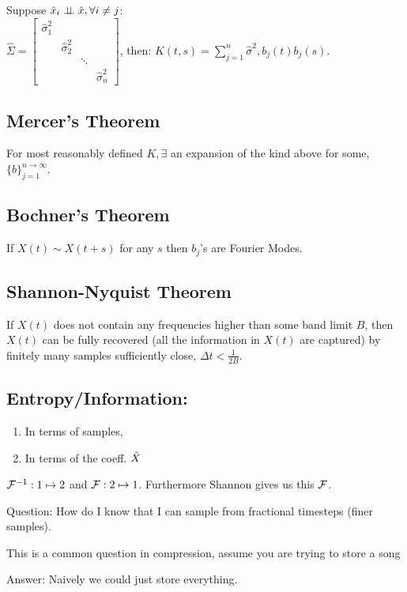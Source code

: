 Suppose $\hat{x}_i \mathrel{\perp\!\!\!\perp} \hat{x}, \forall i \neq j$:\\
$
\hat{\Sigma}=\begin{bmatrix}
\hat{\sigma}_1^2 & & & \\
& \hat{\sigma}_2^2 & & \\
& & \ddots & \\
& & & \hat{\sigma}_n^2
\end{bmatrix}
$, 
then: 
$K(t, s)=\sum_{j=1}^n \hat{\sigma}^2, b_j(t) b_j(s).$

\subsection{Mercer's Theorem}
For most reasonably defined $K, \exists$ an expansion of the kind above for some, $\{b\}_{j=1}^{n \rightarrow \infty}$.

\subsection{Bochner's Theorem}
If $X(t) \sim X(t+s)$ for any $s$ then $b_j$'s are Fourier Modes.

\subsection{Shannon-Nyquist Theorem}
If $X(t)$ does not contain any frequencies higher than some band limit $B$, then $X(t)$ can be fully recovered (all the information in $X(t)$ are captured) by finitely many samples sufficiently close, $\Delta t < \frac1{2B}$.

\subsection{Entropy/Information:}
\begin{enumerate}
    \item In terms of samples, 
    \item In terms of the coeff. $\hat{X}$
\end{enumerate}

$\mathcal{F}^{-1}: 1\mapsto 2$ and $\mathcal{F}: 2\mapsto 1$. Furthermore Shannon gives us this $\mathcal{F}$.

\begin{shaded}
Question: How do I know that I can sample from fractional timesteps (finer samples).
\end{shaded}
This is a common question in compression, assume you are trying to store a song

Answer: Naively we could just store everything.

